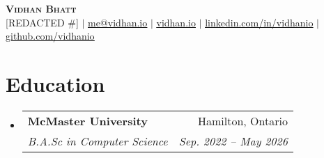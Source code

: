 \documentclass[letterpaper,11pt]{article}
\makeatletter
\newcommand{\resumeItem}[1]{
  \item\small{
    {#1 \vspace{-2pt}}
  }
}
\newcommand{\resumeSubheading}[4]{
  \vspace{-2pt}\item
    \begin{tabular*}{0.97\textwidth}[t]{l@{\extracolsep{\fill}}r}
      \textbf{#1} & #2 \\
      \textit{\small#3} & \textit{\small #4} \\
    \end{tabular*}\vspace{-7pt}
}
\newcommand{\resumeSubSubheading}[2]{
    \item
    \begin{tabular*}{0.97\textwidth}{l@{\extracolsep{\fill}}r}
      \textit{\small#1} & \textit{\small #2} \\
    \end{tabular*}\vspace{-7pt}
}
\newcommand{\resumeSubHeadingListStart}{\begin{itemize}[leftmargin=0.15in, label={}]}
\newcommand{\resumeSubHeadingListEnd}{\end{itemize}}
\newcommand{\resumeItemListStart}{\begin{itemize}}
\newcommand{\resumeItemListEnd}{\end{itemize}\vspace{-5pt}}
\makeatother
\begin{document}

\begin{center}
  \textbf{\Huge \scshape Vidhan Bhatt} \\ \vspace{1pt}
  \small [REDACTED \#] $|$ \href{mailto:me@vidhan.io}{\underline{me@vidhan.io}} $|$
  \href{https://vidhan.io}{\underline{vidhan.io}} $|$
  \href{https://linkedin.com/in/vidhanio}{\underline{linkedin.com/in/vidhanio}} $|$
  \href{https://github.com/vidhanio}{\underline{github.com/vidhanio}}
\end{center}


\section{Education}
\resumeSubHeadingListStart
\resumeSubheading
{McMaster University}{Hamilton, Ontario}
{B.A.Sc in Computer Science}{Sep. 2022 -- May 2026}
\resumeSubHeadingListEnd




\end{document}

